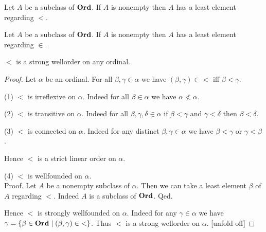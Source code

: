 \documentclass[10pt]{article}
\begin{document}
  \begin{forthel}
    \begin{corollary}
      Let $A$ be a subclass of $\textbf{Ord}$.
      If $A$ is nonempty then $A$ has a least element regarding ${<}$.
    \end{corollary}
  \end{forthel}

  \begin{forthel}
    \begin{corollary}
      Let $A$ be a subclass of $\textbf{Ord}$.
      If $A$ is nonempty then $A$ has a least element regarding ${\in}$.
    \end{corollary}
  \end{forthel}

  \begin{forthel}
    \begin{proposition}
      ${<}$ is a strong wellorder on any ordinal.
    \end{proposition}
    \begin{proof}
      Let $\alpha$ be an ordinal.
      For all $\beta, \gamma \in \alpha$ we have $(\beta,\gamma) \in {<}$ iff
      $\beta < \gamma$.

      (1) ${<}$ is irreflexive on $\alpha$.
      Indeed for all $\beta \in \alpha$ we have $\alpha \nless \alpha$.

      (2) ${<}$ is transitive on $\alpha$.
      Indeed for all $\beta, \gamma, \delta \in \alpha$ if $\beta < \gamma$ and
      $\gamma < \delta$ then $\beta < \delta$.

      (3) ${<}$ is connected on $\alpha$.
      Indeed for any distinct $\beta, \gamma \in \alpha$ we have
      $\beta < \gamma$ or $\gamma < \beta$.

      Hence ${<}$ is a strict linear order on $\alpha$.

      (4) ${<}$ is wellfounded on $\alpha$. \\
      Proof.
        Let $A$ be a nonempty subclass of $\alpha$.
        Then we can take a least element $\beta$ of $A$ regarding ${<}$.
        Indeed $A$ is a subclass of $\textbf{Ord}$.
      Qed.

      Hence ${<}$ is strongly wellfounded on $\alpha$.
      Indeed for any $\gamma \in \alpha$ we have
      $\gamma = \{ \beta \in \textbf{Ord} \mid (\beta,\gamma) \in {<} \}$.
      Thus ${<}$ is a strong wellorder on $\alpha$.
      [unfold off]
    \end{proof}
  \end{forthel}
\end{document}
